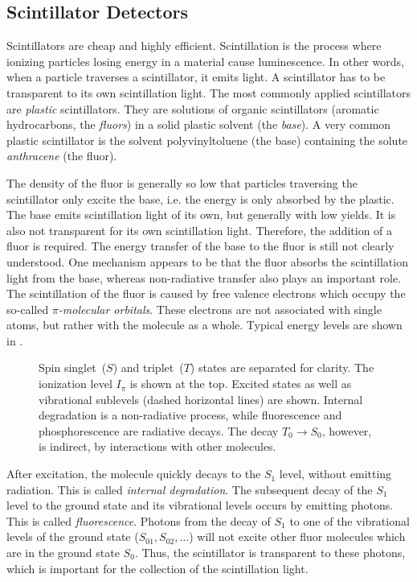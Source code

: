 \subsection{Scintillator Detectors}
\label{sec:scintillator}

Scintillators are cheap and highly efficient.  Scintillation is the process
where ionizing particles losing energy in a material cause luminescence.  In
other words, when a particle traverses a scintillator, it emits light.  A
scintillator has to be transparent to its own scintillation light. The most
commonly applied scintillators are \emph{plastic} scintillators.  They are
solutions of organic scintillators (aromatic hydrocarbons, the \emph{fluors}) in
a solid plastic solvent (the \emph{base}). A very common plastic scintillator is
the solvent polyvinyltoluene (the base) containing the solute \emph{anthracene}
(the fluor).

The density of the fluor is generally so low that particles traversing the
scintillator only excite the base, i.e. the energy is only absorbed by the
plastic.  The base emits scintillation light of its own, but generally with low
yields.  It is also not transparent for its own scintillation light.
Therefore, the addition of a fluor is required.  The energy transfer of the
base to the fluor is still not clearly understood.  One mechanism appears to be
that the fluor absorbs the scintillation light from the base, whereas
non-radiative transfer also plays an important role.  The scintillation of the
fluor is caused by free valence electrons which occupy the so-called
\emph{$\pi$-molecular orbitals}.  These electrons are not associated with single
atoms, but rather with the molecule as a whole.  Typical energy levels are shown
in .
\begin{figure}
\centering

\caption{  Spin singlet~($S$) and triplet~($T$) states are separated for
clarity. The ionization level $I_\pi$ is shown at the top.  Excited states
as well as vibrational sublevels (dashed horizontal lines) are shown.
Internal degradation is a non-radiative process, while fluorescence and
phosphorescence are radiative decays.  The decay $T_0 \to S_0$, however,
is indirect, by interactions with other molecules.}
\label{fig:energy-levels}
\end{figure}
After excitation, the molecule quickly decays to the $S_1$ level, without
emitting radiation.  This is called \emph{internal degradation}.  The subsequent
decay of the $S_1$ level to the ground state and its vibrational levels occurs
by emitting photons.  This is called \emph{fluorescence}.  Photons from the
decay of $S_1$ to one of the vibrational levels of the ground state ($S_{01},
S_{02}, \ldots$)  will not excite other fluor molecules which are in the ground
state $S_0$.  Thus, the scintillator is transparent to these photons, which is
important for the collection of the scintillation light.

